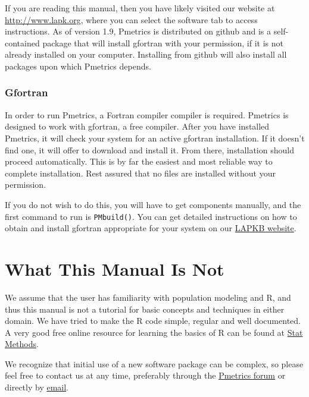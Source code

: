 \documentclass[
]{book}
\begin{document}
If you are reading this manual, then you have likely visited our website
at \href{http://www.lapk.org}{\uline{http://www.lapk.org}}, where you
can select the software tab to access instructions.
As of version 1.9, Pmetrics is distributed on github and is a self-contained
package that will install gfortran with your permission, if it is not
already installed on your computer. Installing from github will also install
all packages upon which Pmetrics depends.

\hypertarget{gfortran}{%
\subsubsection{Gfortran}\label{gfortran}}

In order to run Pmetrics, a Fortran compiler compiler is required.
Pmetrics is designed to work with gfortran, a free compiler. After you
have installed Pmetrics, it will check your system for an active
gfortran installation. If it doesn't find one, it will offer to download
and install it. From there, installation should proceed automatically.
This is by far the easiest and most reliable way to complete
installation. Rest assured that no files are installed without your
permission.

If you do not wish to do this, you will have to get components manually,
and the first command to run is \texttt{PMbuild()}. You can get detailed
instructions on how to obtain and install gfortran appropriate for your
system on our \href{http://www.lapk.org/Pmetrics_install_manual.php}{LAPKB website}.

\hypertarget{what-this-manual-is-not}{%
\section{What This Manual Is Not}\label{what-this-manual-is-not}}

We assume that the user has familiarity with population modeling and R,
and thus this manual is not a tutorial for basic concepts and techniques
in either domain. We have tried to make the R code simple, regular and
well documented. A very good free online resource for learning the
basics of R can be found at \href{http://www.statmethods.net/index.html}{Stat Methods}.

We recognize that initial use of a new software package can be complex,
so please feel free to contact us at any time, preferably through the
\href{http:/www.lapk.org}{Pmetrics forum} or directly by \href{mailto:contact@lapk.org}{email}.
\end{document}
